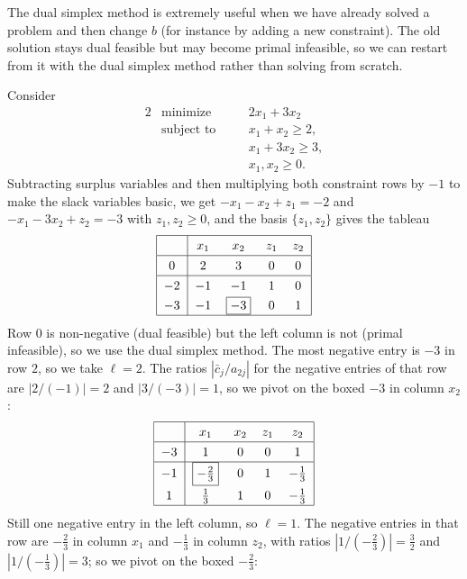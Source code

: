 The dual simplex method is extremely useful when we have already solved a problem and then change $b$ (for instance by adding a new constraint). The old solution stays dual feasible but may become primal infeasible, so we can restart from it with the dual simplex method rather than solving from scratch.

\begin{example}
    Consider
    \begin{alignat*}{2}
        & \text{minimize} \quad && 2x_1 + 3x_2 \\
        & \text{subject to} \quad && x_1 + x_2 \geq 2, \\
        & && x_1 + 3x_2 \geq 3, \\
        & && x_1, x_2 \geq 0.
    \end{alignat*}
    Subtracting surplus variables and then multiplying both constraint rows by $-1$ to make the slack variables basic, we get $-x_1 - x_2 + z_1 = -2$ and $-x_1 - 3x_2 + z_2 = -3$ with $z_1, z_2 \geq 0$, and the basis $\{z_1, z_2\}$ gives the tableau
    $$
    \arraycolsep=6pt\def\arraystretch{1.3}
    \begin{array}{|c|cccc|}\hline
        \multicolumn{1}{|c|}{} & x_1 & x_2 & z_1 & z_2\\\hline
        0 & 2 & 3 & 0 & 0\\\hline
        -2 & -1 & -1 & 1 & 0\\
        -3 & -1 & \boxed{-3} & 0 & 1\\\hline
    \end{array}
    $$
    Row $0$ is non-negative (dual feasible) but the left column is not (primal infeasible), so we use the dual simplex method. The most negative entry is $-3$ in row $2$, so we take $\ell = 2$. The ratios $|\bar c_j/a_{2j}|$ for the negative entries of that row are $|2/(-1)| = 2$ and $|3/(-3)| = 1$, so we pivot on the boxed $-3$ in column $x_2$:
    $$
    \arraycolsep=6pt\def\arraystretch{1.3}
    \begin{array}{|c|cccc|}\hline
        \multicolumn{1}{|c|}{} & x_1 & x_2 & z_1 & z_2\\\hline
        -3 & 1 & 0 & 0 & 1\\\hline
        -1 & \boxed{-\tfrac23} & 0 & 1 & -\frac13\\
        1 & \frac13 & 1 & 0 & -\frac13\\\hline
    \end{array}
    $$
    Still one negative entry in the left column, so $\ell = 1$. The negative entries in that row are $-\frac23$ in column $x_1$ and $-\frac13$ in column $z_2$, with ratios $|1/(-\frac23)| = \frac32$ and $|1/(-\frac13)| = 3$; so we pivot on the boxed $-\frac23$:

\end{example}

